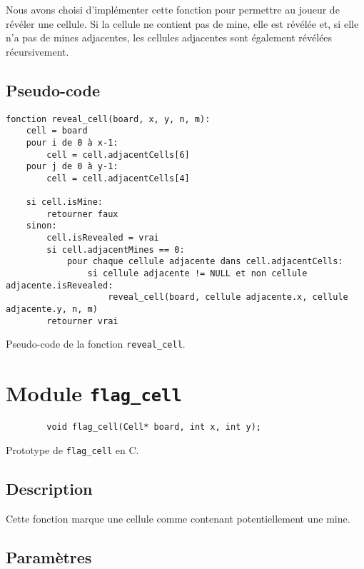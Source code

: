 Nous avons choisi d'implémenter cette fonction pour permettre au joueur de révéler une cellule. 
Si la cellule ne contient pas de mine, elle est révélée et, si elle n'a pas de mines adjacentes, les cellules adjacentes sont également révélées récursivement.
\subsection{Pseudo-code}

\begin{longlisting}
    \begin{verbatim}
fonction reveal_cell(board, x, y, n, m):
    cell = board
    pour i de 0 à x-1:
        cell = cell.adjacentCells[6]
    pour j de 0 à y-1:
        cell = cell.adjacentCells[4]

    si cell.isMine:
        retourner faux
    sinon:
        cell.isRevealed = vrai
        si cell.adjacentMines == 0:
            pour chaque cellule adjacente dans cell.adjacentCells:
                si cellule adjacente != NULL et non cellule adjacente.isRevealed:
                    reveal_cell(board, cellule adjacente.x, cellule adjacente.y, n, m)
        retourner vrai
    \end{verbatim}
    \caption{Pseudo-code de la fonction \texttt{reveal\_cell}.}
\end{longlisting}
\newpage

\section{Module \texttt{flag\_cell}}

\begin{listing}[!htpb]
    \begin{verbatim}
        void flag_cell(Cell* board, int x, int y);
    \end{verbatim}
    \caption{Prototype de \texttt{flag\_cell} en C.}
    \label{listing:c-flag_cell-prototype}
\end{listing}

\subsection{Description}

Cette fonction marque une cellule comme contenant potentiellement une mine.

\subsection{Paramètres}

